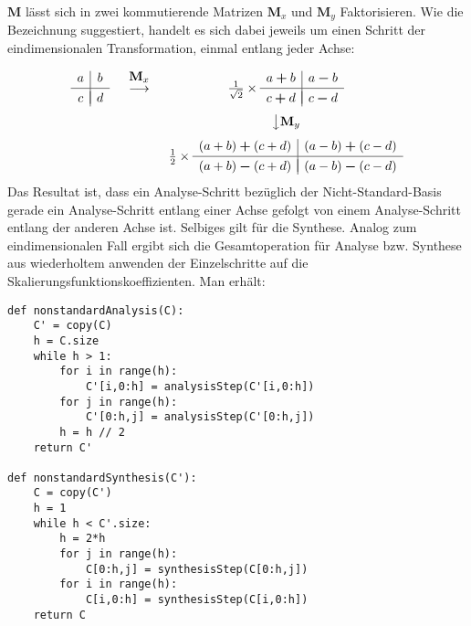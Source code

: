 \documentclass{article}
\begin{document}
%
$\mathbf{M}$ lässt sich in zwei kommutierende Matrizen $\mathbf{M}_x$ und $\mathbf{M}_y$ Faktorisieren. Wie die Bezeichnung suggestiert, handelt es sich dabei jeweils um einen Schritt der eindimensionalen Transformation, einmal entlang jeder Achse:
%
\[
\begin{array}{ccc}
\begin{array}{c|c}
a & b \\[.05cm] 
\hline \\[-0.35cm]
c & d
\end{array}
&
\begin{array}{c}
 \\[-0.3cm] \mathbf{M}_x \\[-0.1cm] \longrightarrow \\ \\
\end{array}
&
\frac{1}{\sqrt{2}} \times
\begin{array}{c|c}
a\boldsymbol{+}b & a\boldsymbol{-}b \\[.05cm] 
\hline \\[-0.35cm]
c\boldsymbol{+}d & c\boldsymbol{-}d
\end{array}
\\[.5cm]
 & & \big\downarrow \mathbf{M}_y \\[.25cm]
 & &
\frac{1}{2} \times
\begin{array}{c|c}
(a+b)\boldsymbol{+}(c+d) & (a-b)\boldsymbol{+}(c-d) \\[.05cm] 
\hline \\[-0.35cm]
(a+b)\boldsymbol{-}(c+d) & (a-b)\boldsymbol{-}(c-d)
\end{array}
\\
\end{array}
\]
%
Das Resultat ist, dass ein Analyse-Schritt bezüglich der Nicht-Standard-Basis gerade ein Analyse-Schritt entlang einer Achse gefolgt von einem Analyse-Schritt entlang der anderen Achse ist. Selbiges gilt für die Synthese. Analog zum eindimensionalen Fall ergibt sich die Gesamtoperation für Analyse bzw. Synthese aus wiederholtem anwenden der Einzelschritte auf die Skalierungsfunktionskoeffizienten. Man erhält:
%
\begin{verbatim}
def nonstandardAnalysis(C):
    C' = copy(C)
    h = C.size
    while h > 1:
        for i in range(h):
            C'[i,0:h] = analysisStep(C'[i,0:h])
        for j in range(h):
            C'[0:h,j] = analysisStep(C'[0:h,j])
        h = h // 2
    return C'

def nonstandardSynthesis(C'):
    C = copy(C')
    h = 1
    while h < C'.size:
        h = 2*h
        for j in range(h):
            C[0:h,j] = synthesisStep(C[0:h,j])
        for i in range(h):
            C[i,0:h] = synthesisStep(C[i,0:h])
    return C
\end{verbatim}
\end{document}
